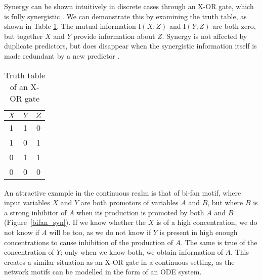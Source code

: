 \documentclass[../main.tex]{subfiles}
\begin{document}
Synergy can be shown intuitively in discrete cases through an X-OR gate, which is fully synergistic \cite{quax2017quantifying}.
We can demonstrate this by examining the truth table, as shown in Table \ref{XOR}.
The mutual information $\mathrm{I}(X;Z)$ and $\mathrm{I}(Y;Z)$ are both zero, but together $X$ and $Y$ provide information about $Z$.
Synergy is not affected by duplicate predictors, but does disappear when the synergistic information itself is made redundant by a new predictor \cite{griffith2014quantifying}.

\begin{table}[ht]
\begin{center}
\begin{tabular}{|c|c||c|}
\hline
$X$ & $Y$ & $Z$ \\
\hline
\hline
1 & 1 & 0 \\
1 & 0 & 1 \\
0 & 1 & 1 \\
0 & 0 & 0 \\
\hline
\end{tabular}
\end{center}
\caption{Truth table of an X-OR gate}
\label{XOR}
\end{table}

An attractive example in the continuous realm is that of bi-fan motif, where input variables $X$ and $Y$ are both promotors of variables $A$ and $B$, but where $B$ is a strong inhibitor of $A$ when its production is promoted by both $A$ and $B$ (Figure~\ref{bifan_syn}).
If we know whether the $X$ is of a high concentration, we do not know if $A$ will be too, as we do not know if $Y$ is present in high enough concentrations to cause inhibition of the production of $A$.
The same is true of the concentration of $Y$; only when we know both, we obtain information of $A$.
This creates a similar situation as an X-OR gate in a continuous setting, as the network motifs can be modelled in the form of an ODE system.
\end{document}
